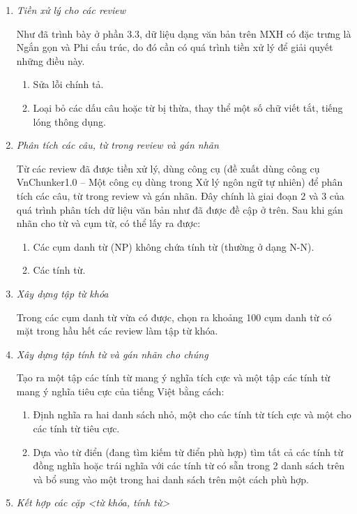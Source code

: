 \documentclass[12pt]{extarticle}
\begin{document}
			 	\begin{enumerate}
					\item \textit{Tiền xử lý cho các review}
						\par Như đã trình bày ở phần 3.3, dữ liệu dạng văn bản trên MXH có đặc trưng là Ngắn gọn và Phi cấu trúc, do đó cần có quá trình tiền xử lý để giải quyết những điều này.
						\begin{enumerate}
							\item Sửa lỗi chính tả.
							\item 	Loại bỏ các dấu câu hoặc từ bị thừa, thay thể một số chữ viết tắt, tiếng lóng thông dụng.
						\end{enumerate}
					\item \textit{Phân tích các câu, từ trong review và gán nhãn}
						\par Từ các review đã được tiền xử lý, dùng công cụ (đề xuất dùng công cụ VnChunker1.0 – Một công cụ dùng trong Xử lý ngôn ngữ tự nhiên) để phân tích các câu, từ trong review và gán nhãn. Đây chính là giai đoạn 2 và 3 của quá trình phân tích dữ liệu văn bản như đã được đề cập ở trên. Sau khi gán nhãn cho từ và cụm từ, có thể lấy ra được:
						\begin{enumerate}
							\item Các cụm danh từ (NP) không chứa tính từ (thường ở dạng N-N).
							\item Các tính từ.
						\end{enumerate}
					\item \textit{Xây dựng tập từ khóa}
						\par Trong các cụm danh từ vừa có được, chọn ra khoảng 100 cụm danh từ có mặt trong hầu hết các review làm tập từ khóa.
					\item\textit{ Xây dựng tập tính từ và gán nhãn cho chúng}
						\par Tạo ra một tập các tính từ mang ý nghĩa tích cực và một tập các tính từ mang ý nghĩa tiêu cực của tiếng Việt bằng cách:
						\begin{enumerate}
							\item Định nghĩa ra hai danh sách nhỏ, một cho các tính từ tích cực và một cho các tính từ tiêu cực.
							\item Dựa vào từ điển (đang tìm kiếm từ điển phù hợp) tìm tất cả các tính từ đồng nghĩa hoặc trái nghĩa với các tính từ có sẵn trong 2 danh sách trên và bổ sung vào một trong hai danh sách trên một cách phù hợp.
						\end{enumerate}
					\item \textit{Kết hợp các cặp <từ khóa, tính từ>}

\end{enumerate}
\end{document}
